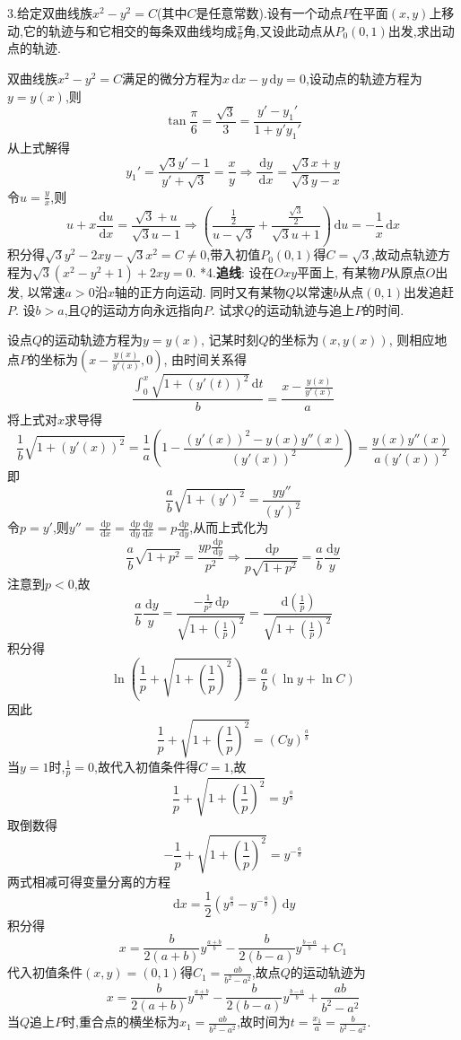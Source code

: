 \documentclass[titlepage,11pt,a4paper,twoside]{report}
\makeatletter
\newcommand\diff{\,\mathrm{d}}
\newenvironment{solve}{\par
	\pushQED{\qed}%
	\normalfont \topsep1\p@\@plus6\p@\relax
	\trivlist
	\item\relax
	{\hspace*{\parindent}{\heiti 解}\@addpunct{:}}\hspace\labelsep\ignorespaces
}{%
	\popQED\endtrivlist\@endpefalse
}
\makeatother
\begin{document}
3.给定双曲线族$x^2-y^2=C$(其中$C$是任意常数).设有一个动点$P$在平面$(x,y)$上移动,它的轨迹与和它相交的每条双曲线均成$\frac{\pi}{6}$角,又设此动点从$P_0(0,1)$出发,求出动点的轨迹.
\begin{solve}
双曲线族$x^2-y^2=C$满足的微分方程为$x\diff x-y\diff y=0$,设动点的轨迹方程为$y=y(x)$,则
\[\tan\frac{\pi}{6}=\frac{\sqrt{3}}{3}=\frac{y'-y_1'}{1+y'y_1'}\]
从上式解得
\[y_1'=\frac{\sqrt{3}y'-1}{y'+\sqrt{3}}=\frac{x}{y}\Rightarrow\frac{\diff y}{\diff x}=\frac{\sqrt{3}x+y}{\sqrt{3}y-x}\]
令$u=\frac{y}{x}$,则
\[u+x\frac{\diff u}{\diff x}=\frac{\sqrt{3}+u}{\sqrt{3}u-1}\Rightarrow\left(\frac{\frac{1}{2}}{u-\sqrt{3}}+\frac{\frac{\sqrt{3}}{2}}{\sqrt{3}u+1}\right)\diff u=-\frac{1}{x}\diff x\]
积分得$\sqrt{3}y^2-2xy-\sqrt{3}x^2=C\neq0$,带入初值$P_0(0,1)$得$C=\sqrt{3}$,故动点轨迹方程为$\sqrt{3}(x^2-y^2+1)+2xy=0$.
\end{solve}
*4.\textbf{追线}: 设在$Oxy$平面上, 有某物$P$从原点$O$出发, 以常速$a>0$沿$x$轴的正方向运动. 同时又有某物$Q$以常速$b$从点$(0,1)$出发追赶$P$. 设$b>a$,且$Q$的运动方向永远指向$P$. 试求$Q$的运动轨迹与追上$P$的时间.
\begin{solve}
设点$Q$的运动轨迹方程为$y=y(x)$, 记某时刻$Q$的坐标为$(x,y(x))$, 则相应地点$P$的坐标为$\left(x-\frac{y(x)}{y'(x)},0\right)$, 由时间关系得
\[\frac{\int_0^x\sqrt{1+(y'(t))^2}\diff t}{b}=\frac{x-\frac{y(x)}{y'(x)}}{a}\]
将上式对$x$求导得
\[\frac{1}{b}\sqrt{1+(y'(x))^2}=\frac{1}{a}\left(1-\frac{(y'(x))^2-y(x)y''(x)}{(y'(x))^2}\right)=\frac{y(x)y''(x)}{a(y'(x))^2}\]
即\[\frac{a}{b}\sqrt{1+(y')^2}=\frac{yy''}{(y')^2}\]
令$p=y'$,则$y''=\frac{\diff p}{\diff x}=\frac{\diff p}{\diff y}\frac{\diff y}{\diff x}=p\frac{\diff p}{\diff y}$,从而上式化为
\[\frac{a}{b}\sqrt{1+p^2}=\frac{yp\frac{\diff p}{\diff y}}{p^2}\Rightarrow\frac{\diff p}{p\sqrt{1+p^2}}=\frac{a}{b}\frac{\diff y}{y}\]
注意到$p<0$,故
\[\frac{a}{b}\frac{\diff y}{y}=\frac{-\frac{1}{p^2}\diff p}{\sqrt{1+\left(\frac{1}{p}\right)^2}}=\frac{\diff\left(\frac{1}{p}\right)}{\sqrt{1+\left(\frac{1}{p}\right)^2}}\]
积分得
\[\ln\left(\frac{1}{p}+\sqrt{1+\left(\frac{1}{p}\right)^2}\right)=\frac{a}{b}(\ln y+\ln C)\]
因此\[\frac{1}{p}+\sqrt{1+\left(\frac{1}{p}\right)^2}=(Cy)^{\frac{a}{b}}\]
当$y=1$时,$\frac{1}{p}=0$,故代入初值条件得$C=1$,故
\[\frac{1}{p}+\sqrt{1+\left(\frac{1}{p}\right)^2}=y^{\frac{a}{b}}\]
取倒数得
\[-\frac{1}{p}+\sqrt{1+\left(\frac{1}{p}\right)^2}=y^{-\frac{a}{b}}\]
两式相减可得变量分离的方程
\[\diff x=\frac{1}{2}\left(y^{\frac{a}{b}}-y^{-\frac{a}{b}}\right)\diff y\]
积分得
\[x=\frac{b}{2(a+b)}y^{\frac{a+b}{b}}-\frac{b}{2(b-a)}y^{\frac{b-a}{b}}+C_1\]
代入初值条件$(x,y)=(0,1)$得$C_1=\frac{ab}{b^2-a^2}$,故点$Q$的运动轨迹为
\[x=\frac{b}{2(a+b)}y^{\frac{a+b}{b}}-\frac{b}{2(b-a)}y^{\frac{b-a}{b}}+\frac{ab}{b^2-a^2}\]
当$Q$追上$P$时,重合点的横坐标为$x_1=\frac{ab}{b^2-a^2}$,故时间为$t=\frac{x_1}{a}=\frac{b}{b^2-a^2}$.
\end{solve}
\end{document}
